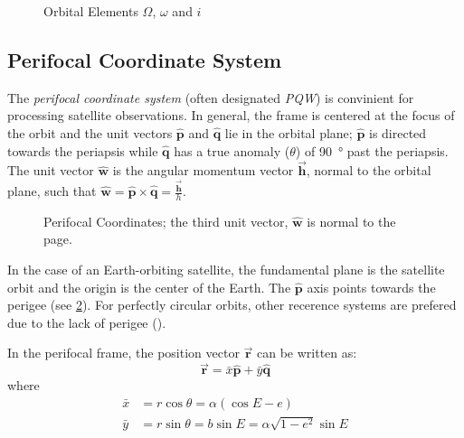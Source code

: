 \begin{figure}
\centering

\caption{Orbital Elements $\Omega$, $\omega$ and $i$}
\label{fig:orbital-elements-Ooi}
\end{figure}

\subsection{Perifocal Coordinate System}
The \emph{perifocal coordinate system} (often designated \emph{PQW}) is 
convinient for processing satellite observations. In general, the frame is 
centered at the focus of the orbit and the unit vectors $\hat{\bm{p}}$ and 
$\hat{\bm{q}}$ lie in the orbital plane; $\hat{\bm{p}}$ is directed towards 
the periapsis while $\hat{\bm{q}}$ has a true anomaly ($\theta$) of 
\SI{90}{\degree} past the periapsis. The unit vector $\hat{\bm{w}}$ is the 
angular momentum vector $\vec{\bm{h}}$, normal to the orbital plane, such that 
$\hat{\bm{w}} = \hat{\bm{p}} \times \hat{\bm{q}} = \frac{\vec{\bm{h}}}{h}$.

\begin{figure}
\centering
{}

\caption{Perifocal Coordinates; the third unit vector, $\hat{\bm{w}}$ is 
         normal to the page.}
\label{fig:eccentric-anomaly}
\end{figure}


In the case of an Earth-orbiting satellite, the fundamental plane is the 
satellite orbit and the origin is the center of the Earth. The $\hat{\bm{p}}$ 
axis points towards the perigee (see \ref{fig:eccentric-anomaly}). For 
perfectly circular orbits, other recerence systems are prefered due to the 
lack of perigee (\cite{Vallado}).

In the perifocal frame, the position vector $\vec{\bm{r}}$ can be written as:
\begin{equation}
  \label{eq:kurtis2107}
  \vec{\bm{r}} = \bar{x} \hat{\bm{p}} + \bar{y} \hat{\bm{q}}
\end{equation}
where
\begin{subequations}
  \begin{align}
  \label{eq:mong230a}
  \bar{x} &= r \cos \theta = \alpha ( \cos E - e ) \\
  \label{eq:mong230b}
  \bar{y} &= r \sin \theta = b \sin E = \alpha \sqrt{1-e^2} \sin E
  \end{align}
\end{subequations}

